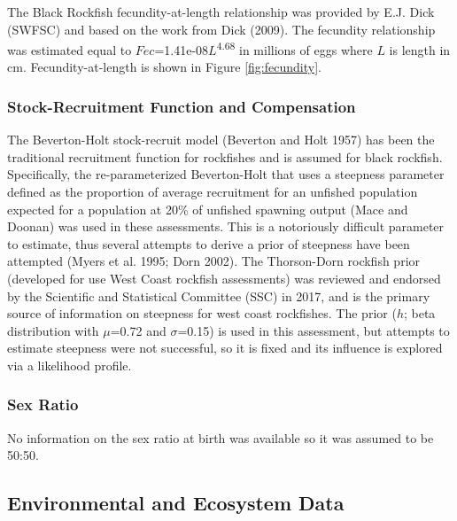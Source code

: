 \documentclass[11pt,
  english,
  letterpaper,
]{article}
\begin{document}
The Black Rockfish fecundity-at-length relationship was provided by E.J. Dick (SWFSC) and based on the work from Dick (2009). The fecundity relationship was estimated equal to \(Fec\)=1.41e-08\(L\)\textsuperscript{4.68} in millions of eggs where \(L\) is length in cm. Fecundity-at-length is shown in Figure \ref{fig:fecundity}.

\hypertarget{stock-recruitment-function-and-compensation}{%
\subsubsection{Stock-Recruitment Function and Compensation}\label{stock-recruitment-function-and-compensation}}

The Beverton-Holt stock-recruit model (Beverton and Holt 1957) has been the traditional recruitment function for rockfishes and is assumed for black rockfish. Specifically, the re-parameterized Beverton-Holt that uses a steepness parameter defined as the proportion of average recruitment for an unfished population expected for a population at 20\% of unfished spawning output (Mace and Doonan) was used in these assessments. This is a notoriously difficult parameter to estimate, thus several attempts to derive a prior of steepness have been attempted (Myers et al. 1995; Dorn 2002). The Thorson-Dorn rockfish prior (developed for use West Coast rockfish assessments) was reviewed and endorsed by the Scientific and Statistical Committee (SSC) in 2017, and is the primary source of information on steepness for west coast rockfishes. The prior (\(h\); beta distribution with \(\mu\)=0.72 and \(\sigma\)=0.15) is used in this assessment, but attempts to estimate steepness were not successful, so it is fixed and its influence is explored via a likelihood profile.

\hypertarget{sex-ratio}{%
\subsubsection{Sex Ratio}\label{sex-ratio}}

No information on the sex ratio at birth was available so it was assumed to be 50:50.

\hypertarget{environmental-and-ecosystem-data}{%
\subsection{Environmental and Ecosystem Data}\label{environmental-and-ecosystem-data}}
\end{document}
